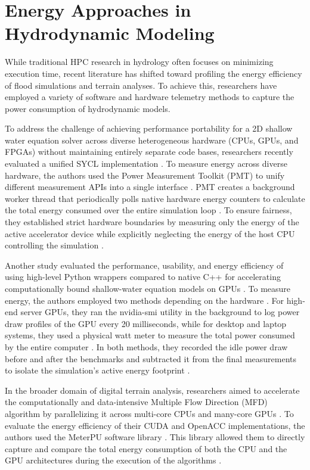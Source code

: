 \section{Energy Approaches in Hydrodynamic Modeling}
\label{sec:energy-telemetry}

While traditional HPC research in hydrology often focuses on minimizing execution time, recent literature has shifted toward profiling the energy efficiency of flood simulations and terrain analyses. To achieve this, researchers have employed a variety of software and hardware telemetry methods to capture the power consumption of hydrodynamic models.

To address the challenge of achieving performance portability for a 2D shallow water equation solver across diverse heterogeneous hardware (CPUs, GPUs, and FPGAs) without maintaining entirely separate code bases, researchers recently evaluated a unified SYCL implementation \cite{Buettner2025}. To measure energy across diverse hardware, the authors used the Power Measurement Toolkit (PMT) to unify different measurement APIs into a single interface \cite{Buettner2025}. PMT creates a background worker thread that periodically polls native hardware energy counters to calculate the total energy consumed over the entire simulation loop \cite{Buettner2025}. To ensure fairness, they established strict hardware boundaries by measuring only the energy of the active accelerator device while explicitly neglecting the energy of the host CPU controlling the simulation \cite{Buettner2025}.

Another study evaluated the performance, usability, and energy efficiency of using high-level Python wrappers compared to native C++ for accelerating computationally bound shallow-water equation models on GPUs \cite{Holm2020}. To measure energy, the authors employed two methods depending on the hardware \cite{Holm2020}. For high-end server GPUs, they  ran the nvidia-smi utility in the background to log power draw profiles of the GPU every 20 milliseconds, while for desktop and laptop systems, they used a physical watt meter to measure the total power consumed by the entire computer \cite{Holm2020}. In both methods, they recorded the idle power draw before and after the benchmarks and subtracted it from the final measurements to isolate the simulation's active energy footprint \cite{Holm2020}.

In the broader domain of digital terrain analysis, researchers aimed to accelerate the computationally and data-intensive Multiple Flow Direction (MFD) algorithm by parallelizing it across multi-core CPUs and many-core GPUs \cite{Stojanovic2019}. To evaluate the energy efficiency of their CUDA and OpenACC implementations, the authors used the MeterPU software library \cite{Stojanovic2019}. This library allowed them to directly capture and compare the total energy consumption of both the CPU and the GPU architectures during the execution of the algorithms \cite{Stojanovic2019}.

